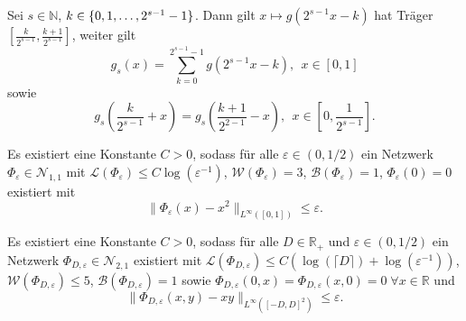 \documentclass[11pt]{scrartcl}
\newcommand{\N}{\mathbb{N}} %
\newcommand{\R}{\mathbb{R}} %
\newcommand{\norm}[1]{\| #1 \|}
\begin{document}
\begin{center}
\end{center}

\begin{lemma}
    Sei \(s\in\N\), \(k \in \{0,1,\ldots, 2^{s-1}-1\}\). Dann gilt \(x \mapsto g(2^{s-1} x - k)\) 
    hat Träger \(\left[\frac{k}{2^{s-1}}, \frac{k+1}{2^{s-1}} \right]\), weiter gilt 
    \[ g_s(x) = \sum_{k=0}^{2^{s-1}-1} g(2^{s-1}x - k),\ \ x\in [0,1] \]
    sowie 
    \[ g_s\left(\frac{k}{2^{s-1}}+x\right) = g_s\left(\frac{k+1}{2^{2-1}} - x\right), \ \ x \in \left[0, \frac{1}{2^{s-1}}\right]. \]
\end{lemma}

\begin{proposition} %
    Es existiert eine Konstante \(C>0\), sodass für alle \(\varepsilon \in (0,1/2)\) 
    ein Netzwerk \(\Phi_\varepsilon \in \mathcal{N}_{1,1}\) mit 
    \(\mathcal{L}(\Phi_\varepsilon) \leq C\log(\varepsilon^{-1})\), 
    \(\mathcal{W}(\Phi_\varepsilon) = 3\), \(\mathcal{B}(\Phi_\varepsilon) = 1\), 
    \(\Phi_\varepsilon(0) = 0\) existiert mit 
    \[ \norm{\Phi_\varepsilon(x) - x^2 }_{L^\infty([0,1])} \leq \varepsilon. \]
\end{proposition}

\begin{proposition} %
    Es existiert eine Konstante \(C>0\), sodass für alle \(D\in \R_+\) und \(\varepsilon \in (0, 1/2)\) 
    ein Netzwerk \(\Phi_{D,\varepsilon} \in \mathcal{N}_{2,1}\) existiert mit 
    \(\mathcal{L}(\Phi_{D, \varepsilon}) \leq C (\log(\lceil D \rceil) + \log(\varepsilon^{-1})) \), 
    \(\mathcal{W}(\Phi_{D, \varepsilon}) \leq 5\), \(\mathcal{B}(\Phi_{D, \varepsilon}) = 1\) sowie 
    \(\Phi_{D,\varepsilon}(0,x) = \Phi_{D,\varepsilon}(x,0) = 0 \;\forall x\in \R\) und 
    \[ \norm{\Phi_{D,\varepsilon}(x,y) - xy}_{L^\infty([-D,D]^2)} \leq \varepsilon. \]
\end{proposition}
\end{document}
